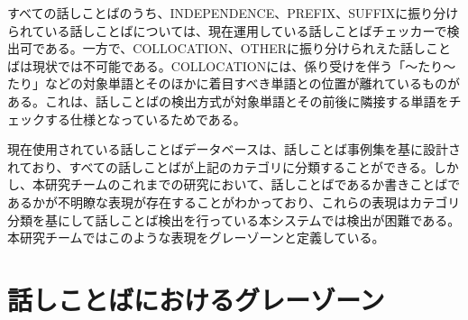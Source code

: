 すべての話しことばのうち、INDEPENDENCE、PREFIX、SUFFIXに振り分けられている話しことばについては、現在運用している話しことばチェッカーで検出可である。一方で、COLLOCATION、OTHERに振り分けられえた話しことばは現状では不可能である。COLLOCATIONには、係り受けを伴う「～たり～たり」などの対象単語とそのほかに着目すべき単語との位置が離れているものがある。これは、話しことばの検出方式が対象単語とその前後に隣接する単語をチェックする仕様となっているためである。

現在使用されている話しことばデータベースは、話しことば事例集を基に設計されており、すべての話しことばが上記のカテゴリに分類することができる。しかし、本研究チームのこれまでの研究において、話しことばであるか書きことばであるかが不明瞭な表現が存在することがわかっており、これらの表現はカテゴリ分類を基にして話しことば検出を行っている本システムでは検出が困難である。本研究チームではこのような表現をグレーゾーンと定義している。

\section{話しことばにおけるグレーゾーン}

